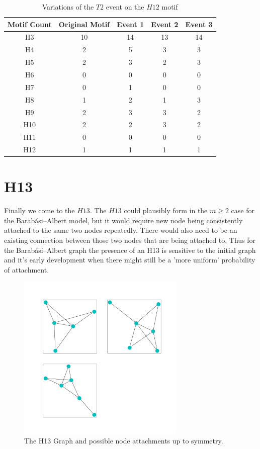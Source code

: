 \begin{table}
    \centering
    \begin{tabular}{||c c c c c||} 
    \hline
    Motif Count & Original Motif & Event 1 & Event 2 & Event 3 \\ [0.5ex] 
    \hline\hline
    H3 & 10 & 14 & 13 & 14\\ 
    \hline
    H4 & 2 & 5 & 3 & 3 \\
    \hline
    H5 & 2 & 3 & 2 & 3 \\
    \hline
    H6 & 0 & 0 & 0 & 0 \\
    \hline
    H7 & 0 & 1 & 0 & 0 \\
    \hline
    H8 & 1 & 2 & 1 & 3\\
    \hline
    H9 & 2 & 3 & 3 & 2 \\
    \hline
    H10 & 2 & 2 & 3 & 2 \\
    \hline
    H11 & 0 & 0 & 0 & 0 \\
    \hline
    H12 & 1 & 1 & 1 & 1\\
    \hline
   \end{tabular}
   \caption{Variations of the $T2$ event on the $H12$ motif}
   \label{table:10}
\end{table}


\FloatBarrier

\section{H13}
Finally we come to the $H13$. The $H13$ could plausibly form in the $m \geq 2$ case for the 
Barabási–Albert model, but it would require new node being consistently attached to the 
same two nodes repeatedly. There would also need to be an existing connection between those two nodes
that are being attached to. Thus for the Barabási–Albert graph the presence of an H13 is sensitive
to the initial graph and it's early development when there might still be a 'more uniform' probability
of attachment.

\begin{figure}[!ht]
    \includegraphics[width=8cm]{Images/H13_evolution.png}
    \centering
    \caption{The H13 Graph and possible node attachments up to symmetry.}
\end{figure}

